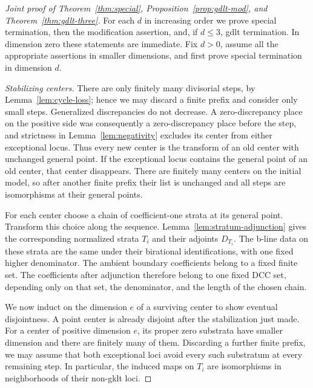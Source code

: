 \begin{proof}[Joint proof of Theorem~\ref{thm:special},
Proposition~\ref{prop:gdlt-mod}, and Theorem~\ref{thm:gdlt-three}]
For each $d$ in increasing order we prove special
termination, then the modification assertion, and, if
$d\leq3$, gdlt termination.  In dimension zero these
statements are immediate.  Fix $d>0$, assume all the
appropriate assertions in smaller dimensions, and first
prove special termination in dimension $d$.

\smallskip
\noindent\emph{Stabilizing centers.}
There are only finitely many divisorial steps, by
Lemma~\ref{lem:cycle-loss}; hence we may discard a finite
prefix and consider only small steps.  Generalized
discrepancies do not decrease.  A zero-discrepancy place on
the positive side was consequently a zero-discrepancy
place before the step, and strictness in
Lemma~\ref{lem:negativity} excludes its center from either
exceptional locus.  Thus every new center is the transform
of an old center with unchanged general point.  If the
exceptional locus contains the general point of an old
center, that center disappears.  There are finitely many
centers on the initial model, so after another finite
prefix their list is unchanged and all steps are
isomorphisms at their general points.

For each center choose a chain of coefficient-one strata
at its general point.  Transform this choice along the
sequence.  Lemma~\ref{lem:stratum-adjunction} gives the
corresponding normalized strata $T_i$ and their adjoints
$D_{T_i}$.  The b-line data on these strata are the same
under their birational identifications, with one fixed
higher denominator.  The ambient boundary coefficients
belong to a fixed finite set.  The coefficients after
adjunction therefore belong to one fixed DCC set, depending
only on that set, the denominator, and the length of the
chosen chain.

We now induct on the dimension $e$ of a surviving center
to show eventual disjointness.  A point center is already
disjoint after the stabilization just made.  For a center
of positive dimension $e$, its proper zero substrata have
smaller dimension and there are finitely many of them.
Discarding a further finite prefix, we may assume that
both exceptional loci avoid every such substratum at
every remaining step.  In particular, the induced maps
on $T_i$ are isomorphisms in neighborhoods of their
non-gklt loci.


\end{proof}
